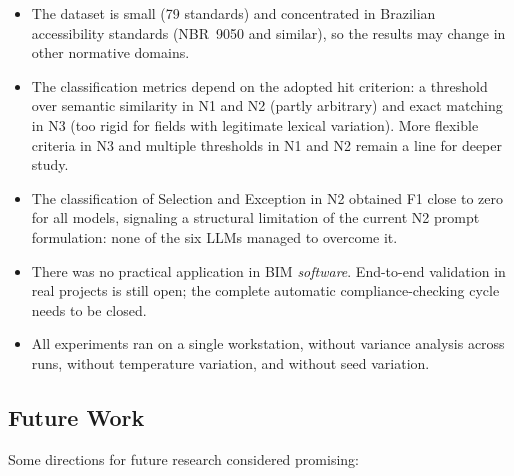 \documentclass[a4paper,fleqn]{cas-sc}
\begin{document}
\begin{itemize}
    \item The dataset is small (79 standards) and concentrated in Brazilian accessibility standards (NBR~9050 and similar), so the results may change in other normative domains.
    \item The classification metrics depend on the adopted hit criterion: a threshold over semantic similarity in N1 and N2 (partly arbitrary) and exact matching in N3 (too rigid for fields with legitimate lexical variation). More flexible criteria in N3 and multiple thresholds in N1 and N2 remain a line for deeper study.
    \item The classification of Selection and Exception in N2 obtained F1 close to zero for all models, signaling a structural limitation of the current N2 prompt formulation: none of the six LLMs managed to overcome it.
    \item There was no practical application in BIM \textit{software}. End-to-end validation in real projects is still open; the complete automatic compliance-checking cycle needs to be closed.
    \item All experiments ran on a single workstation, without variance analysis across runs, without temperature variation, and without seed variation.
\end{itemize}

\subsection{Future Work}

Some directions for future research considered promising:
\end{document}
